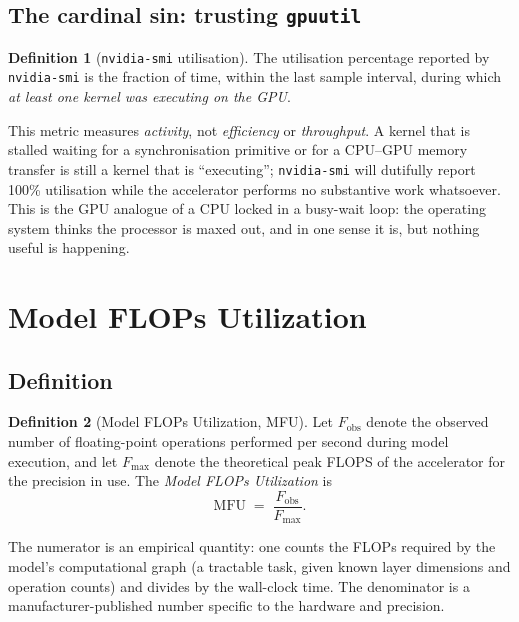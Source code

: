 \documentclass[11pt,a4paper]{article}
\theoremstyle{definition}
\newtheorem{definition}{Definition}[section]
\theoremstyle{remark}
\theoremstyle{plain}
\newcommand{\MFU}{\mathrm{MFU}}
\begin{document}
\subsection{The cardinal sin: trusting \texttt{gpuutil}}

\begin{definition}[\texttt{nvidia-smi} utilisation]
The utilisation percentage reported by \texttt{nvidia-smi} is the
fraction of time, within the last sample interval, during which
\emph{at least one kernel was executing on the GPU}.
\end{definition}

This metric measures \emph{activity}, not \emph{efficiency} or
\emph{throughput}. A kernel that is stalled waiting for a
synchronisation primitive or for a CPU--GPU memory transfer is still a
kernel that is ``executing''; \texttt{nvidia-smi} will dutifully report
100\% utilisation while the accelerator performs no substantive work
whatsoever. This is the GPU analogue of a CPU locked in a busy-wait loop:
the operating system thinks the processor is maxed out, and in one sense
it is, but nothing useful is happening.

\section{Model FLOPs Utilization}
\label{sec:mfu}

\subsection{Definition}

\begin{definition}[Model FLOPs Utilization, MFU]
Let $F_{\text{obs}}$ denote the observed number of floating-point
operations performed per second during model execution, and let
$F_{\max}$ denote the theoretical peak FLOPS of the accelerator for the
precision in use. The \emph{Model FLOPs Utilization} is
\begin{equation}
\MFU \;=\; \frac{F_{\text{obs}}}{F_{\max}}.
\label{eq:mfu}
\end{equation}
\end{definition}

The numerator is an empirical quantity: one counts the FLOPs required by
the model's computational graph (a tractable task, given known layer
dimensions and operation counts) and divides by the wall-clock time. The denominator is a
manufacturer-published number specific to the hardware and precision.
\end{document}
